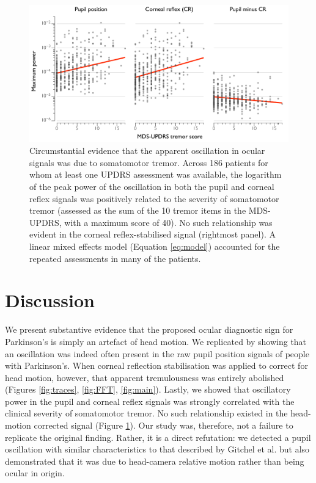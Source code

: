 \documentclass[jou,a4paper]{apa6}
\begin{document}
\begin{figure}[htbp]
\begin{center}
\includegraphics {Figures/Figure_5_UPDRS_correlation}
\caption{Circumstantial evidence that the apparent oscillation in ocular signals was due to somatomotor tremor. Across 186 patients for whom at least one UPDRS assessment was available, the logarithm of the peak power of the oscillation in both the pupil and corneal reflex signals was positively related to the severity of somatomotor tremor (assessed as the sum of the 10 tremor items in the MDS-UPDRS, with a maximum score of 40). No such relationship was evident in the corneal reflex-stabilised signal (rightmost panel). A linear mixed effects model (Equation \ref{eq:model}) accounted for the repeated assessments in many of the patients.
}
\label{fig:UPDRS}
\end{center}
\end{figure}

\section{Discussion}
We present substantive evidence that the proposed ocular diagnostic sign for Parkinson's is simply an artefact of head motion. We replicated \citet{Gitchel2012Pervasive-ocula} by showing that an oscillation was indeed often present in the raw pupil position signals of people with Parkinson's. When corneal reflection stabilisation was applied to correct for head motion, however, that apparent tremulousness was entirely abolished (Figures \ref{fig:traces}, \ref{fig:FFT}, \ref{fig:main}). Lastly, we showed that oscillatory power in the pupil and corneal reflex signals was strongly correlated with the clinical severity of somatomotor tremor. No such relationship existed in the head-motion corrected signal (Figure \ref{fig:UPDRS}). Our study was, therefore, not a failure to replicate the original finding. Rather, it is a direct refutation: we detected a pupil oscillation with similar characteristics to that described by Gitchel et al. but also demonstrated that it was due to head-camera relative motion rather than being ocular in origin.
\end{document}
